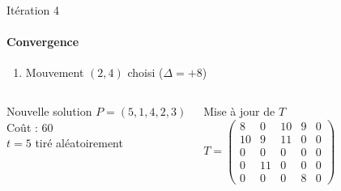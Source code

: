 \documentclass[10pt, handout]{beamer}
\begin{document}
\begin{frame}{Itération 4}
    \framesubtitle{Convergence}


    \begin{enumerate}
        \item Mouvement \( (2,4) \) choisi (\( \Delta = +8 \))
    \end{enumerate}

    \begin{columns}
        \begin{alertblock}{Nouvelle solution}
            \( P = (5, 1, 4, 2, 3) \) \\
            Coût : 60 \\
            \( t = 5 \) tiré aléatoirement
        \end{alertblock}

        \begin{exampleblock}{Mise à jour de \( T \)}
            \[
                T = \begin{pmatrix}
                    8  & 0  & 10 & 9 & 0 \\
                    10 & 9  & 11 & 0 & 0 \\
                    0  & 0  & 0  & 0 & 0 \\
                    0  & 11 & 0  & 0 & 0 \\
                    0  & 0  & 0  & 8 & 0
                \end{pmatrix}
            \]
        \end{exampleblock}
    \end{columns}
\end{frame}
\end{document}

